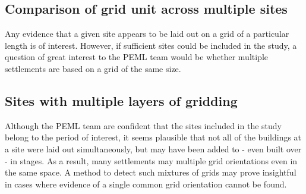 \documentclass[../../ArchStats.tex]{subfiles}
\begin{document}
\subsection{Comparison of grid unit across multiple sites}
Any evidence that a given site appears to be laid out on a grid of a particular length is of interest. However, if sufficient sites could be included in the study, a question of great interest to the PEML team would be whether multiple settlements are based on a grid of the same size.

\subsection{Sites with multiple layers of gridding}
Although the PEML team are confident that the sites included in the study belong to the period of interest, it seems plausible that not all of the buildings at a site were laid out simultaneously, but may have been added to - even built over - in stages. As a result, many settlements may multiple grid orientations even in the same space. A method to detect such mixtures of grids may prove insightful in cases where evidence of a single common grid orientation cannot be found.



\end{document}
